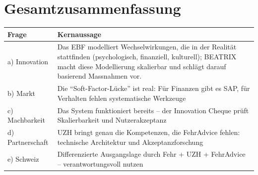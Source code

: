 \documentclass[11pt,a4paper]{article}
\begin{document}
\vspace{1cm}

\newpage


\section*{Gesamtzusammenfassung}

\begin{table}[h]
\centering
\begin{tabular}{@{}L{3cm}L{10cm}@{}}
\toprule
\textbf{Frage} & \textbf{Kernaussage} \\
\midrule
a) Innovation & Das EBF modelliert Wechselwirkungen, die in der Realität stattfinden (psychologisch, finanziell, kulturell); BEATRIX macht diese Modellierung skalierbar und schlägt darauf basierend Massnahmen vor. \\
b) Markt & Die ``Soft-Factor-Lücke'' ist real: Für Finanzen gibt es SAP, für Verhalten fehlen systematische Werkzeuge \\
c) Machbarkeit & Das System funktioniert bereits -- der Innovation Cheque prüft Skalierbarkeit und Nutzerakzeptanz \\
d) Partnerschaft & UZH bringt genau die Kompetenzen, die FehrAdvice fehlen: technische Architektur und Akzeptanzforschung \\
e) Schweiz & Differenzierte Ausgangslage durch Fehr + UZH + FehrAdvice -- verantwortungsvoll nutzen \\
\bottomrule
\end{tabular}
\end{table}
\end{document}
